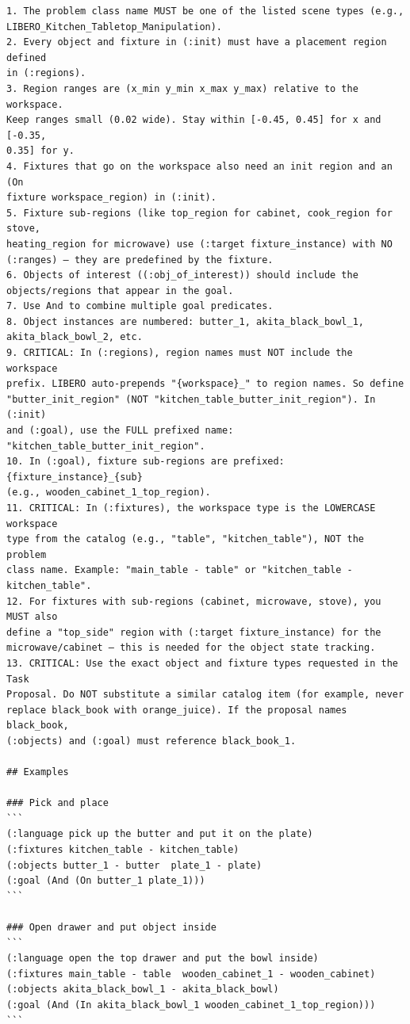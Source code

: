 \begin{lstlisting}[style=ratsappendixprompt]
1. The problem class name MUST be one of the listed scene types (e.g.,
LIBERO_Kitchen_Tabletop_Manipulation).
2. Every object and fixture in (:init) must have a placement region defined
in (:regions).
3. Region ranges are (x_min y_min x_max y_max) relative to the workspace.
Keep ranges small (0.02 wide). Stay within [-0.45, 0.45] for x and [-0.35,
0.35] for y.
4. Fixtures that go on the workspace also need an init region and an (On
fixture workspace_region) in (:init).
5. Fixture sub-regions (like top_region for cabinet, cook_region for stove,
heating_region for microwave) use (:target fixture_instance) with NO
(:ranges) — they are predefined by the fixture.
6. Objects of interest ((:obj_of_interest)) should include the
objects/regions that appear in the goal.
7. Use And to combine multiple goal predicates.
8. Object instances are numbered: butter_1, akita_black_bowl_1,
akita_black_bowl_2, etc.
9. CRITICAL: In (:regions), region names must NOT include the workspace
prefix. LIBERO auto-prepends "{workspace}_" to region names. So define
"butter_init_region" (NOT "kitchen_table_butter_init_region"). In (:init)
and (:goal), use the FULL prefixed name: "kitchen_table_butter_init_region".
10. In (:goal), fixture sub-regions are prefixed: {fixture_instance}_{sub}
(e.g., wooden_cabinet_1_top_region).
11. CRITICAL: In (:fixtures), the workspace type is the LOWERCASE workspace
type from the catalog (e.g., "table", "kitchen_table"), NOT the problem
class name. Example: "main_table - table" or "kitchen_table -
kitchen_table".
12. For fixtures with sub-regions (cabinet, microwave, stove), you MUST also
define a "top_side" region with (:target fixture_instance) for the
microwave/cabinet — this is needed for the object state tracking.
13. CRITICAL: Use the exact object and fixture types requested in the Task
Proposal. Do NOT substitute a similar catalog item (for example, never
replace black_book with orange_juice). If the proposal names black_book,
(:objects) and (:goal) must reference black_book_1.

## Examples

### Pick and place
```
(:language pick up the butter and put it on the plate)
(:fixtures kitchen_table - kitchen_table)
(:objects butter_1 - butter  plate_1 - plate)
(:goal (And (On butter_1 plate_1)))
```

### Open drawer and put object inside
```
(:language open the top drawer and put the bowl inside)
(:fixtures main_table - table  wooden_cabinet_1 - wooden_cabinet)
(:objects akita_black_bowl_1 - akita_black_bowl)
(:goal (And (In akita_black_bowl_1 wooden_cabinet_1_top_region)))
```


\end{lstlisting}
